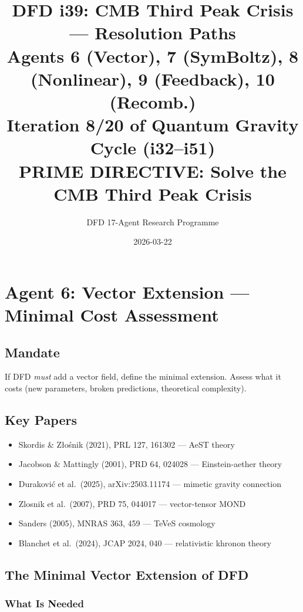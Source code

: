 \documentclass[11pt,a4paper]{article}
\title{DFD i39: CMB Third Peak Crisis --- Resolution Paths\\[6pt]
\large Agents 6 (Vector), 7 (SymBoltz), 8 (Nonlinear), 9 (Feedback), 10 (Recomb.)\\[6pt]
\normalsize Iteration 8/20 of Quantum Gravity Cycle (i32--i51)\\
PRIME DIRECTIVE: Solve the CMB Third Peak Crisis}
\author{DFD 17-Agent Research Programme}
\date{2026-03-22}
\begin{document}
\maketitle
\tableofcontents
\newpage

\section{Agent 6: Vector Extension --- Minimal Cost Assessment}
\label{sec:agent6}

\subsection{Mandate}

If DFD \emph{must} add a vector field, define the minimal extension. Assess what it costs (new parameters, broken predictions, theoretical complexity).

\subsection{Key Papers}

\begin{itemize}
\item Skordis \& Z{\l}o\'{s}nik (2021), PRL 127, 161302 --- AeST theory
\item Jacobson \& Mattingly (2001), PRD 64, 024028 --- Einstein-aether theory
\item Durakovi\'{c} et al.\ (2025), arXiv:2503.11174 --- mimetic gravity connection
\item Zlosnik et al.\ (2007), PRD 75, 044017 --- vector-tensor MOND
\item Sanders (2005), MNRAS 363, 459 --- TeVeS cosmology
\item Blanchet et al.\ (2024), JCAP 2024, 040 --- relativistic khronon theory
\end{itemize}

\subsection{The Minimal Vector Extension of DFD}

\subsubsection{What Is Needed}
\end{document}
